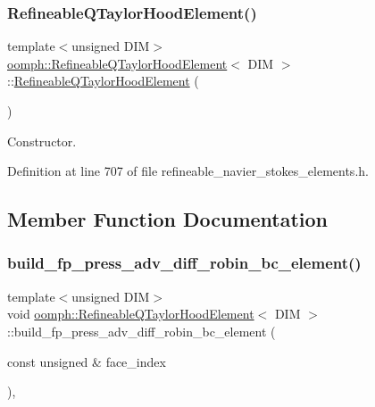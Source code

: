\subsubsection{\texorpdfstring{Refineable\+Q\+Taylor\+Hood\+Element()}{RefineableQTaylorHoodElement()}}
{\footnotesize\ttfamily template$<$unsigned D\+IM$>$ \\
\hyperlink{classoomph_1_1RefineableQTaylorHoodElement}{oomph\+::\+Refineable\+Q\+Taylor\+Hood\+Element}$<$ D\+IM $>$\+::\hyperlink{classoomph_1_1RefineableQTaylorHoodElement}{Refineable\+Q\+Taylor\+Hood\+Element} (\begin{DoxyParamCaption}{ }\end{DoxyParamCaption})\hspace{0.3cm}{\ttfamily [inline]}}



Constructor. 



Definition at line 707 of file refineable\+\_\+navier\+\_\+stokes\+\_\+elements.\+h.



\subsection{Member Function Documentation}
\mbox{\label{classoomph_1_1RefineableQTaylorHoodElement_ab7f69a90be6e5129d2dbf294e01642af}} 
\subsubsection{\texorpdfstring{build\+\_\+fp\+\_\+press\+\_\+adv\+\_\+diff\+\_\+robin\+\_\+bc\+\_\+element()}{build\_fp\_press\_adv\_diff\_robin\_bc\_element()}}
{\footnotesize\ttfamily template$<$unsigned D\+IM$>$ \\
void \hyperlink{classoomph_1_1RefineableQTaylorHoodElement}{oomph\+::\+Refineable\+Q\+Taylor\+Hood\+Element}$<$ D\+IM $>$\+::build\+\_\+fp\+\_\+press\+\_\+adv\+\_\+diff\+\_\+robin\+\_\+bc\+\_\+element (\begin{DoxyParamCaption}\item[{const unsigned \&}]{face\+\_\+index }\end{DoxyParamCaption})\hspace{0.3cm}{\ttfamily [inline]}, {\ttfamily [virtual]}}



